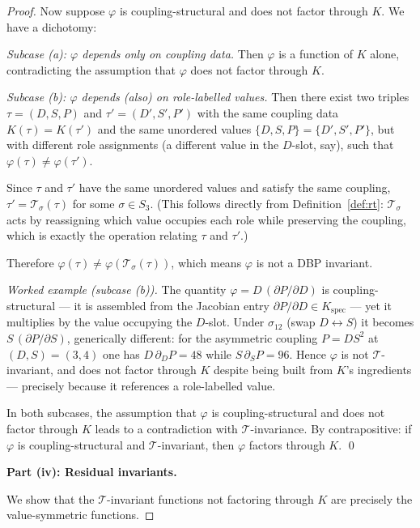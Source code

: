 \documentclass[12pt,a4paper]{article}
\theoremstyle{definition}
\theoremstyle{plain}
\theoremstyle{remark}
\newcommand{\T}{\mathcal{T}}
\begin{document}
\begin{proof}
Now suppose $\varphi$ is coupling-structural and does not factor through $K$. We have a dichotomy:

\smallskip
\noindent\emph{Subcase (a): $\varphi$ depends only on coupling data.}
Then $\varphi$ is a function of $K$ alone, contradicting the assumption that $\varphi$ does not factor through $K$.

\smallskip
\noindent\emph{Subcase (b): $\varphi$ depends (also) on role-labelled values.}
Then there exist two triples $\tau = (D, S, P)$ and $\tau' = (D', S', P')$ with the same coupling data $K(\tau) = K(\tau')$ and the same unordered values $\{D, S, P\} = \{D', S', P'\}$, but with different role assignments (a different value in the $D$-slot, say), such that $\varphi(\tau) \neq \varphi(\tau')$.

Since $\tau$ and $\tau'$ have the same unordered values and satisfy the same coupling, $\tau' = \T_\sigma(\tau)$ for some $\sigma \in S_3$. (This follows directly from Definition~\ref{def:rt}: $\T_\sigma$ acts by reassigning which value occupies each role while preserving the coupling, which is exactly the operation relating $\tau$ and $\tau'$.)

Therefore $\varphi(\tau) \neq \varphi(\T_\sigma(\tau))$, which means $\varphi$ is not a DBP invariant.

\smallskip
\noindent\emph{Worked example (subcase (b)).} The quantity $\varphi = D\,(\partial P/\partial D)$ is coupling-structural --- it is assembled from the Jacobian entry $\partial P/\partial D \in K_{\mathrm{spec}}$ --- yet it multiplies by the value occupying the $D$-slot. Under $\sigma_{12}$ (swap $D \leftrightarrow S$) it becomes $S\,(\partial P/\partial S)$, generically different: for the asymmetric coupling $P = D S^2$ at $(D,S) = (3,4)$ one has $D\,\partial_D P = 48$ while $S\,\partial_S P = 96$. Hence $\varphi$ is not $\T$-invariant, and does not factor through $K$ despite being built from $K$'s ingredients --- precisely because it references a role-labelled value.

\smallskip
In both subcases, the assumption that $\varphi$ is coupling-structural and does not factor through $K$ leads to a contradiction with $\T$-invariance. By contrapositive: if $\varphi$ is coupling-structural and $\T$-invariant, then $\varphi$ factors through $K$. \qed

\medskip
\noindent\textbf{Part (iv): Residual invariants.}

We show that the $\T$-invariant functions not factoring through $K$ are precisely the value-symmetric functions.


\end{proof}
\end{document}
